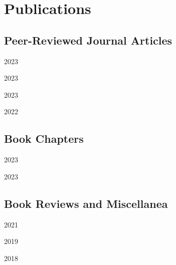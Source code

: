 \documentclass[12pt,letterpaper]{report}
\begin{document}
    \section*{Publications}
    \subsection*{Peer-Reviewed Journal Articles}
    \begin{tablist}
        \item[2023] \tab{} 
        \item[2023] \tab{}
        \item[2023] \tab{}
        \item[2022] \tab{} 
    \end{tablist}

    \subsection*{Book Chapters}
    \begin{tablist}  
        \item[2023] \tab{}
        \item[2023] \tab{}
    \end{tablist}

    \subsection*{Book Reviews and Miscellanea}
    \begin{tablist}  
        \item[2021] \tab{}
        \item[2019] \tab{}
        \item[2018] \tab{}
    \end{tablist}

    
\end{document}
